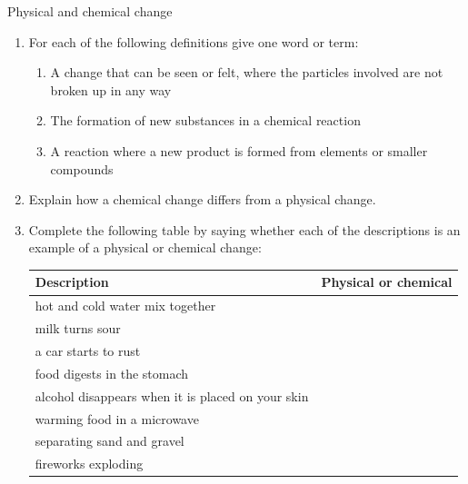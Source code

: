 \label{m38711*secfhsst!!!underscore!!!id584}
            \begin{eocexercises}{Physical and chemical change}
            \nopagebreak \noindent
      \label{m38711*id65631}\begin{enumerate}[noitemsep, label=\textbf{\arabic*}. ] 
            \label{m38711*uid6234}\item For each of the following definitions give one word or term:
\begin{enumerate}[noitemsep, label=\textbf{\alph*}. ] 
 \item A change that can be seen or felt, where the particles involved are not broken up in any way
\item The formation of new substances in a chemical reaction
\item A reaction where a new product is formed from elements or smaller compounds
\end{enumerate}
\item Explain how a chemical change differs from a physical change.
\item Complete the following table by saying whether each of the descriptions is an example of a physical or chemical change:
          \begin{table}[H]
        \begin{center}
      \label{m38711*id65648}
    \noindent
      \begin{tabular}{|l|l|}\hline
        \textbf{Description} &
        \textbf{Physical or chemical} \\ \hline
        hot and cold water mix together &
     \\ \hline
        milk turns sour &
     \\ \hline
        a car starts to rust &
       \\ \hline
        food digests in the stomach &
       \\ \hline
        alcohol disappears when it is placed on your skin &
       \\ \hline
        warming food in a microwave &
     \\ \hline
        separating sand and gravel &
       \\ \hline
        fireworks exploding &
       \\ \hline
    \end{tabular}

\end{center}
\end{table}
\end{enumerate}
\end{eocexercises}
